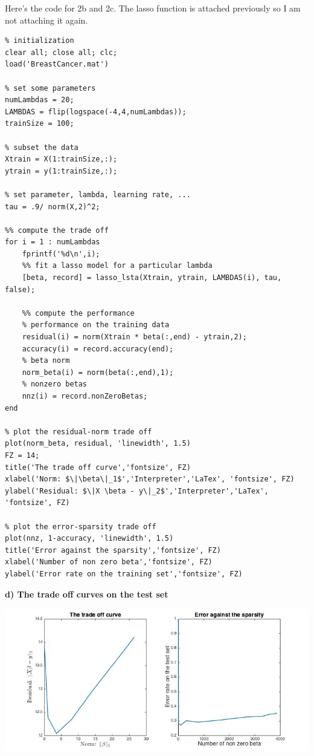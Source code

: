 \documentclass[paper=a4, fontsize=11pt]{scrartcl} %
\numberwithin{equation}{section} %
\numberwithin{figure}{section} %
\numberwithin{table}{section} %
\begin{document}
\newpage
Here's the code for 2b and 2c. 
The lasso function is attached previously so I am not attaching it again. 
\begin{lstlisting}
% initialization
clear all; close all; clc;
load('BreastCancer.mat')

% set some parameters
numLambdas = 20;
LAMBDAS = flip(logspace(-4,4,numLambdas));
trainSize = 100;

% subset the data
Xtrain = X(1:trainSize,:);
ytrain = y(1:trainSize,:);

% set parameter, lambda, learning rate, ...
tau = .9/ norm(X,2)^2;

%% compute the trade off
for i = 1 : numLambdas
    fprintf('%d\n',i);
    %% fit a lasso model for a particular lambda
    [beta, record] = lasso_lsta(Xtrain, ytrain, LAMBDAS(i), tau, false);
    
    %% compute the performance
    % performance on the training data
    residual(i) = norm(Xtrain * beta(:,end) - ytrain,2);
    accuracy(i) = record.accuracy(end);
    % beta norm 
    norm_beta(i) = norm(beta(:,end),1);
    % nonzero betas
    nnz(i) = record.nonZeroBetas;
end

% plot the residual-norm trade off 
plot(norm_beta, residual, 'linewidth', 1.5)
FZ = 14;
title('The trade off curve','fontsize', FZ)
xlabel('Norm: $\|\beta\|_1$','Interpreter','LaTex', 'fontsize', FZ)
ylabel('Residual: $\|X \beta - y\|_2$','Interpreter','LaTex', 'fontsize', FZ)

% plot the error-sparsity trade off 
plot(nnz, 1-accuracy, 'linewidth', 1.5)
title('Error against the sparsity','fontsize', FZ)
xlabel('Number of non zero beta','fontsize', FZ)
ylabel('Error rate on the training set','fontsize', FZ)
\end{lstlisting}


\newpage
\textbf{d) The trade off curves on the test set}
\begin{center}
\includegraphics[scale=.6]{hw6_2d_tradeoffs.jpg}
\end{center}
\end{document}

